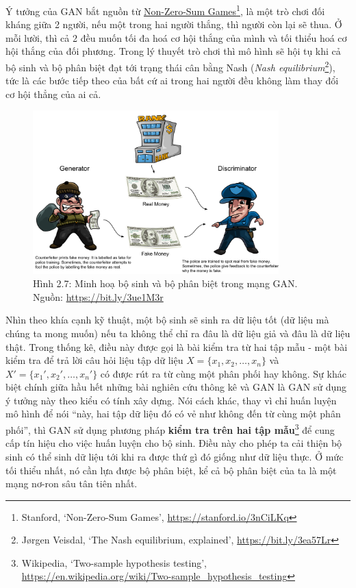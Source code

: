 \documentclass[a4paper]{article}
\begin{document}
\noindent
Ý tưởng của GAN bắt nguồn từ \href{https://cs.stanford.edu/people/eroberts/courses/soco/projects/1998-99/game-theory/nonzero.html}{Non-Zero-Sum Games}\footnote{Stanford, \lq Non-Zero-Sum Games\rq, \href{https://stanford.io/3nCiLKq}{https://stanford.io/3nCiLKq}}, là một trò chơi đối kháng giữa 2 người, nếu một trong hai người thắng, thì người còn lại sẽ thua. Ở mỗi lười, thì cả 2 đều muốn tối đa hoá cơ hội thắng của mình và tối thiểu hoá cơ hội thắng của đối phương. Trong lý thuyết trò chơi thì mô hình sẽ hội tụ khi cả bộ sinh và bộ phân biệt đạt tới trạng thái cân bằng Nash (\textit{Nash equilibrium}\footnote{Jørgen Veisdal, \lq The Nash equilibrium, explained\rq, \href{https://bit.ly/3ea57Lr}{https://bit.ly/3ea57Lr}}), tức là các bước tiếp theo của bất cứ ai trong hai người đều không làm thay đổi cơ hội thẳng của ai cả.

\begin{figure}[h!]
\centering
\includegraphics[width=9.5cm]{images/2_7.png}
\caption{Hình 2.7: Minh hoạ bộ sinh và bộ phân biệt trong mạng GAN. Nguồn: \href{https://bit.ly/3ue1M3r}{https://bit.ly/3ue1M3r}}
\end{figure}

\noindent
Nhìn theo khía cạnh kỹ thuật, một bộ sinh sẽ sinh ra dữ liệu tốt (dữ liệu mà chúng ta mong muốn) nếu ta không thể chỉ ra đâu là dữ liệu giả và đâu là dữ liệu thật. Trong thống kê, điều này được gọi là bài kiểm tra từ hai tập mẫu - một bài kiểm tra để trả lời câu hỏi liệu tập dữ liệu $X = \{x_1, x_2, \dots, x_n\}$ và $X'=\{x_1', x_2', \dots, x_n'\}$ có được rút ra từ cùng một phân phối hay không. Sự khác biệt chính giữa hầu hết những bài nghiên cứu thông kê và GAN là GAN sử dụng ý tưởng này theo kiểu có tính xây dựng. Nói cách khác, thay vì chỉ huấn luyện mô hình để nói ``này, hai tập dữ liệu đó có vẻ như không đến từ cùng một phân phối'', thì GAN sử dụng phương pháp \textbf{kiểm tra trên hai tập mẫu}\footnote{Wikipedia, \lq Two-sample hypothesis testing\rq, \href{https://en.wikipedia.org/wiki/Two-sample\_hypothesis\_testing}{https://en.wikipedia.org/wiki/Two-sample\_hypothesis\_testing}} để cung cấp tín hiệu cho việc huấn luyện cho bộ sinh. Điều này cho phép ta cải thiện bộ sinh có thể sinh dữ liệu tới khi ra được thứ gì đó giống như dữ liệu thực. Ở mức tối thiểu nhất, nó cần lựa được bộ phân biệt, kể cả bộ phân biệt của ta là một mạng nơ-ron sâu tân tiên nhất.
\end{document}
